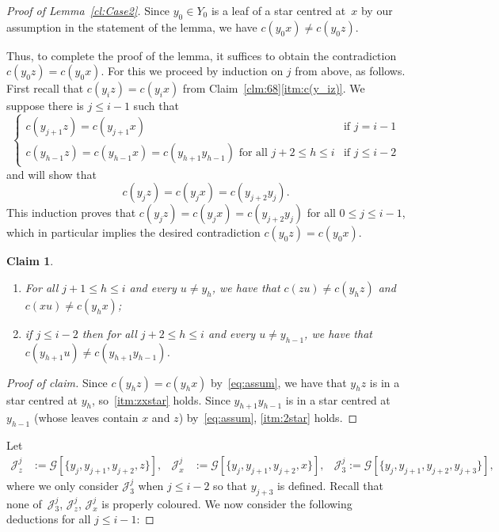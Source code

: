 \documentclass[a4paper, 12pt]{article}
\numberwithin{equation}{section}
\newtheorem{claim}[theorem]{Claim}
\newenvironment{proofclaim}[1][Proof of claim]{\begin{proof}[#1]\renewcommand*{\qedsymbol}{\(\blacksquare\)}}{\end{proof}}
\newcommand{\ms}[1]{\mathscr{#1}}
\begin{document}
\begin{proof}[Proof of Lemma~\ref{cl:Case2}]
Since $y_0 \in Y_0$ is a leaf of a star centred at~$x$ by our assumption in the statement of the lemma, we have $c(y_0x) \neq c(y_0z)$.

Thus, to complete the proof of the lemma, it suffices to obtain the contradiction $c(y_0z)=c(y_0x)$.
For this we proceed by induction on $j$ from above, as follows.
First recall that $c(y_iz)=c(y_ix)$ from Claim~\ref{clm:68}\ref{itm:c(y_iz)}.
We suppose there is $j \le i-1$ such that
\begin{equation}\label{eq:assum}
\begin{cases}
    c(y_{j+1}z) =c(y_{j+1}x) &\mbox{if } j = i-1\\
    c(y_{h-1}z) = c(y_{h-1}x) = c(y_{h+1}y_{h-1}) \text{ for all }j+2 \leq h \leq i &\mbox{if }j \leq i-2
\end{cases}
\end{equation}
and will show that
\begin{equation}\label{eq:goal}
c(y_{j}z) = c(y_{j}x) = c(y_{j+2}y_{j}).
\end{equation}
This induction proves that $c(y_jz)=c(y_jx)=c(y_{j+2}y_j)$ for all $0 \leq j \leq i-1$, which in particular implies the desired contradiction $c(y_0z)=c(y_0x)$.

\begin{claim} \label{clm:69}\hfill
\begin{enumerate}[label = {$(\rm \roman*)$}]
\item\label{itm:zxstar} For all $j+1 \leq h \leq i$ and every $u \neq y_h$, we have that $c(zu) \neq c(y_{h}z)$ and $c(xu) \neq c(y_hx)$;

\item\label{itm:2star} if $j \leq i-2$ then for all $j+2 \leq h \leq i$ and every $u \neq y_{h-1}$, we have that $c(y_{h+1}u) \neq c(y_{h+1}y_{h-1})$. 

\end{enumerate}
\end{claim}

\begin{proofclaim}
Since $c(y_{h}z) = c(y_{h}x)$ by~\eqref{eq:assum}, we have that $y_{h}z$ is in a star centred at $y_{h}$, so~\ref{itm:zxstar} holds.
Since $y_{h+1}y_{h-1}$ is in a star centred at $y_{h-1}$ (whose leaves contain $x$ and $z$) 
by~\eqref{eq:assum}, \ref{itm:2star} holds. 
\end{proofclaim}


Let 
\begin{align*}
\ms{J}_z^j &:= \ms{G}[\{y_j,y_{j+1},y_{j+2},z\}],
&
\ms{J}_x^j &:= \ms{G}[\{y_j,y_{j+1},y_{j+2},x\}],
&
\ms{J}_3^j := \ms{G}[\{y_j,y_{j+1},y_{j+2},y_{j+3}\}],
\end{align*}
where we only consider $\ms{J}_3^j$ when $j \leq i-2$ so that $y_{j+3}$ is defined.
Recall that none of~$\ms{J}_3^j$, $\ms{J}_z^j$, $\ms{J}_x^j$ is properly coloured.
We now consider the following deductions for all $j \leq i-1$:



\end{proof}
\end{document}
